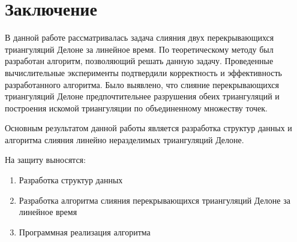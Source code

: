 \documentclass[12pt]{article}
\begin{document}
\section{Заключение}
В данной работе рассматривалась задача слияния двух перекрывающихся триангуляций Делоне
за линейное время. По теоретическому методу \cite{MestOverlap} был разработан алгоритм,
позволяющий решать данную задачу.
Проведенные вычислительные эксперименты подтвердили корректность и эффективность разработанного алгоритма.
Было выявлено, что слияние перекрывающихся триангуляций Делоне предпочтительнее
разрушения обеих триангуляций и построения искомой триангуляции по объединенному множеству точек.

Основным результатом данной работы является разработка структур данных и
алгоритма слияния линейно неразделимых триангуляций Делоне.

На защиту выносятся:

\begin{enumerate}
	\item Разработка структур данных
	\item Разработка алгоритма слияния перекрывающихся триангуляций Делоне за линейное время
	\item Программная реализация алгоритма
\end{enumerate}

\newpage




\end{document}
